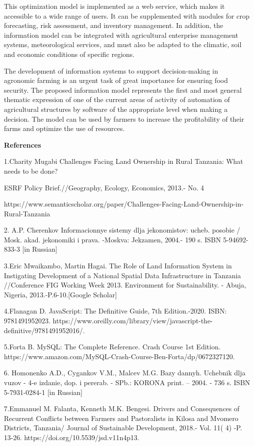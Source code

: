This optimization model is implemented as a web service, which makes it
accessible to a wide range of users. It can be supplemented with modules
for crop forecasting, risk assessment, and inventory management. In
addition, the information model can be integrated with agricultural
enterprise management systems, meteorological services, and must also be
adapted to the climatic, soil and economic conditions of specific
regions.

The development of information systems to support decision-making in
agronomic farming is an urgent task of great importance for ensuring
food security. The proposed information model represents the first and
most general thematic expression of one of the current areas of activity
of automation of agricultural structures by software of the appropriate
level when making a decision. The model can be used by farmers to
increase the profitability of their farms and optimize the use of
resources.

\textbf{References}

1.Charity Mugabi Challenges Facing Land Ownership in Rural Tanzania:
What needs to be done?

ESRF Policy Brief.//Geography, Ecology, Economics, 2013.- No. 4

https://www.semanticscholar.org/paper/Challenges-Facing-Land-Ownership-in-Rural-Tanzania

2. A.P. Cherenkov Informacionnye sistemy dlja jekonomistov: ucheb.
posobie / Mosk. akad. jekonomiki i prava. -Moskva: Jekzamen, 2004.- 190
s. ISBN 5-94692-833-3 {[}in Russian{]}

3.Eric Mwaikambo, Martin Hagai. The Role of Land Information System in
Instigating Development of a National Spatial Data Infrastructure in
Tanzania //Conference FIG Working Week 2013. Environment for
Sustainability. - Abuja, Nigeria, 2013.-P.6-10.{[}Google Scholar{]}

4.Flanagan D. JavaScript: The Definitive Guide, 7th Edition.-2020. ISBN:
9781491952023.
https://www.oreilly.com/library/view/javascript-the-definitive/9781491952016/.

5.Forta B. MySQL: The Complete Reference. Crash Course 1st Edition.
https://www.amazon.com/MySQL-Crash-Course-Ben-Forta/dp/0672327120.

6. Homonenko A.D., Cygankov V.M., Mal\textquotesingle cev M.G. Bazy
dannyh. Uchebnik dlja vuzov - 4-e izdanie, dop. i pererab. - SPb.:
KORONA print. -- 2004. - 736 s. ISBN 5-7931-0284-1 {[}in Russian{]}

7.Emmanuel M. Falanta, Kenneth M.K. Bengesi. Drivers and Consequences of
Recurrent Conflicts between Farmers and Pastoralists in Kilosa and
Mvomero Districts, Tanzania/ Journal of Sustainable Development, 2018.-
Vol. 11( 4) -P. 13-26. https://doi.org/10.5539/jsd.v11n4p13. \hl{}

